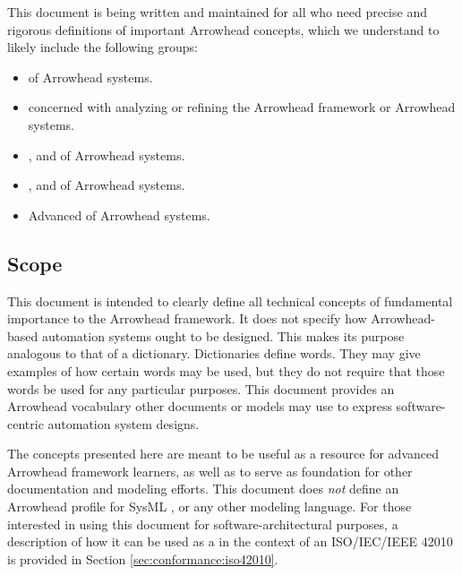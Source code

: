 This document is being written and maintained for all who need precise and rigorous definitions of important Arrowhead concepts, which we understand to likely include the following groups:

\begin{itemize}
\item {} of Arrowhead systems.
\item {} concerned with analyzing or refining the Arrowhead framework or Arrowhead systems.
\item {},  and  of Arrowhead systems.
\item {},  and  of Arrowhead systems.
\item Advanced  of Arrowhead systems.
\end{itemize}

\subsection{Scope}
\label{sec:introduction:scope}

This document is intended to clearly define all technical concepts of fundamental importance to the Arrowhead framework.
It does not specify how Arrowhead-based automation systems ought to be designed.
This makes its purpose analogous to that of a dictionary.
Dictionaries define words.
They may give examples of how certain words may be used, but they do not require that those words be used for any particular purposes.
This document provides an Arrowhead vocabulary other documents or models may use to express software-centric automation system designs.

The concepts presented here are meant to be useful as a resource for advanced Arrowhead framework learners, as well as to serve as foundation for other documentation and modeling efforts.
This document does \textit{not} define an Arrowhead profile for SysML \cite{omg2019sysml}, or any other modeling language.
For those interested in using this document for software-architectural purposes, a description of how it can be used as a  in the context of an ISO/IEC/IEEE 42010  is provided in Section \ref{sec:conformance:iso42010}.

